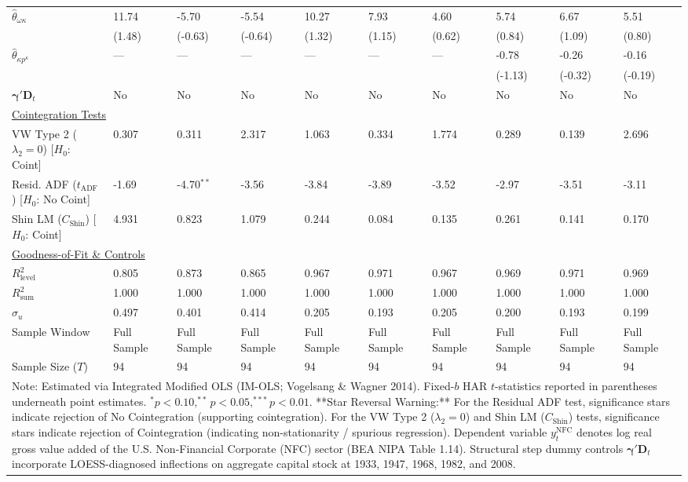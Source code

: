 \begin{landscape}
\begin{table}[H]
\begin{tabular}{p{4.8cm}p{1.3cm}p{1.3cm}p{1.3cm}p{1.3cm}p{1.3cm}p{1.3cm}p{1.3cm}p{1.3cm}p{1.3cm}}
$\hat{\theta}_{\omega \kappa}$ & 11.74 & -5.70 & -5.54 & 10.27 & 7.93 & 4.60 & 5.74 & 6.67 & 5.51  \\
 & {\scriptsize (1.48)} & {\scriptsize (-0.63)} & {\scriptsize (-0.64)} & {\scriptsize (1.32)} & {\scriptsize (1.15)} & {\scriptsize (0.62)} & {\scriptsize (0.84)} & {\scriptsize (1.09)} & {\scriptsize (0.80)}  \\
$\hat{\theta}_{\kappa p^{\kappa}}$ & --- & --- & --- & --- & --- & --- & -0.78 & -0.26 & -0.16  \\
 &  &  &  &  &  &  & {\scriptsize (-1.13)} & {\scriptsize (-0.32)} & {\scriptsize (-0.19)}  \\
$\boldsymbol{\gamma}' \mathbf{D}_t$ & No & No & No & No & No & No & No & No & No  \\
\midrule
\multicolumn{10}{l}{\underline{Cointegration Tests}} \\
VW Type 2 ($\lambda_2 = 0$) [$H_0$: Coint] & 0.307 & 0.311 & 2.317 & 1.063 & 0.334 & 1.774 & 0.289 & 0.139 & 2.696  \\
Resid. ADF ($t_{\text{ADF}}$) [$H_0$: No Coint] & -1.69 & -4.70$^{**}$ & -3.56 & -3.84 & -3.89 & -3.52 & -2.97 & -3.51 & -3.11  \\
Shin LM ($C_{\text{Shin}}$) [$H_0$: Coint] & 4.931 & 0.823 & 1.079 & 0.244 & 0.084 & 0.135 & 0.261 & 0.141 & 0.170  \\
\midrule
\multicolumn{10}{l}{\underline{Goodness-of-Fit \& Controls}} \\
$R_{\text{level}}^2$ & 0.805 & 0.873 & 0.865 & 0.967 & 0.971 & 0.967 & 0.969 & 0.971 & 0.969  \\
$R_{\text{sum}}^2$ & 1.000 & 1.000 & 1.000 & 1.000 & 1.000 & 1.000 & 1.000 & 1.000 & 1.000  \\
$\hat{\sigma}_u$ & 0.497 & 0.401 & 0.414 & 0.205 & 0.193 & 0.205 & 0.200 & 0.193 & 0.199  \\
Sample Window & Full Sample & Full Sample & Full Sample & Full Sample & Full Sample & Full Sample & Full Sample & Full Sample & Full Sample  \\
Sample Size ($T$) & 94 & 94 & 94 & 94 & 94 & 94 & 94 & 94 & 94  \\
\bottomrule
\multicolumn{10}{p{19.5cm}}{\footnotesize Note: Estimated via Integrated Modified OLS (IM-OLS; Vogelsang \& Wagner 2014). Fixed-$b$ HAR $t$-statistics reported in parentheses underneath point estimates. $^*p<0.10, ^{**}p<0.05, ^{***}p<0.01$. **Star Reversal Warning:** For the Residual ADF test, significance stars indicate rejection of No Cointegration (supporting cointegration). For the VW Type 2 ($\lambda_2 = 0$) and Shin LM ($C_{\text{Shin}}$) tests, significance stars indicate rejection of Cointegration (indicating non-stationarity / spurious regression). Dependent variable $y_t^{\text{NFC}}$ denotes log real gross value added of the U.S. Non-Financial Corporate (NFC) sector (BEA NIPA Table 1.14). Structural step dummy controls $\boldsymbol{\gamma}' \mathbf{D}_t$ incorporate LOESS-diagnosed inflections on aggregate capital stock at 1933, 1947, 1968, 1982, and 2008.}
\end{tabular}
\end{table}
\end{landscape}
